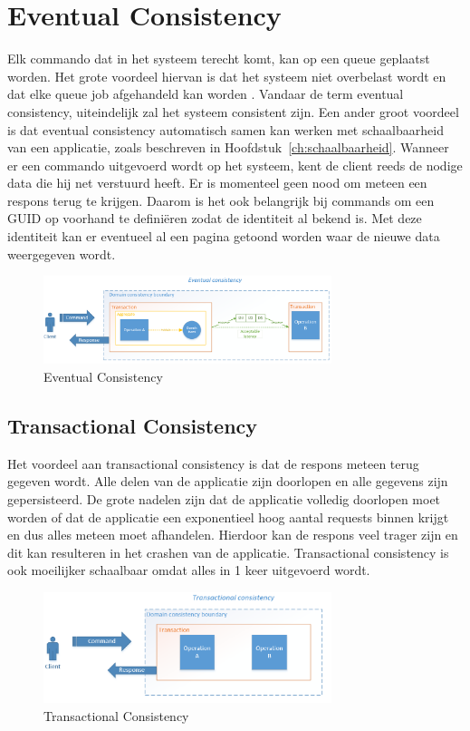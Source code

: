 
\section{Eventual Consistency}
\label{sec:eventual-consistency}

Elk commando dat in het systeem terecht komt, kan op een queue geplaatst worden. Het grote voordeel hiervan is dat het systeem niet overbelast wordt en dat elke queue job afgehandeld kan worden \autocite{King2015EventualConsistency}. Vandaar de term eventual consistency, uiteindelijk zal het systeem consistent zijn. Een ander groot voordeel is dat eventual consistency automatisch samen kan werken met schaalbaarheid van een applicatie, zoals beschreven in Hoofdstuk~\ref{ch:schaalbaarheid}. Wanneer er een commando uitgevoerd wordt op het systeem, kent de client reeds de nodige data die hij net verstuurd heeft. Er is momenteel geen nood om meteen een respons terug te krijgen.
Daarom is het ook belangrijk bij commands om een \gls{GUID} op voorhand te definiëren zodat de identiteit al bekend is. Met deze identiteit kan er eventueel al een pagina getoond worden waar de nieuwe data weergegeven wordt.

\begin{figure}[h]
\caption{Eventual Consistency}
\centering
\includegraphics[width=0.75\textwidth]{img/eventual-consistency}
\end{figure}

\subsection{Transactional Consistency}
\label{subsec:transactional-consistency}

Het voordeel aan transactional consistency is dat de respons meteen terug gegeven wordt. Alle delen van de applicatie zijn doorlopen en alle gegevens zijn gepersisteerd. De grote nadelen zijn dat de applicatie volledig doorlopen moet worden of dat de applicatie een exponentieel hoog aantal requests binnen krijgt en dus alles meteen moet afhandelen. Hierdoor kan de respons veel trager zijn en dit kan resulteren in het crashen van de applicatie.
Transactional consistency is ook moeilijker schaalbaar omdat alles in 1 keer uitgevoerd wordt.

\begin{figure}[h]
\caption{Transactional Consistency}
\centering
\includegraphics[width=0.75\textwidth]{img/transactional-consistency}
\end{figure}
